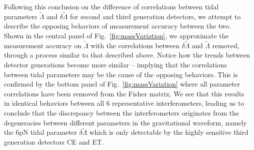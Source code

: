 \documentclass[prd,twocolumn,nofootinbib,superscriptaddress,amsmath,amssymb]{revtex4-1}
\begin{document}
Following this conclusion on the difference of correlations between tidal parameters $\tilde\Lambda$ and $\delta\tilde\Lambda$ for second and third generation detectors, we attempt to describe the opposing behaviors of measurement accuracy between the two.
Shown in the central panel of Fig.~\ref{fig:massVariation}, we approximate the measurement accuracy on $\tilde\Lambda$ with the correlations between $\delta\tilde\Lambda$ and $\tilde\Lambda$ removed, through a process similar to that described above. 
Notice how the trends between detector generations become more similar -- implying that the correlations between tidal parameters may be the cause of the opposing behaviors.
This is confirmed by the bottom panel of Fig.~\ref{fig:massVariation} where all parameter correlations have been removed from the Fisher matrix.
We see that this results in identical behaviors between all 6 representative interferometers, leading us to conclude that the discrepancy between the interferometers originates from the degeneracies between different parameters in the gravitational waveform, namely the 6pN tidal parameter $\delta\tilde\Lambda$ which is only detectable by the highly sensitive third generation detectors CE and ET.



\end{document}

